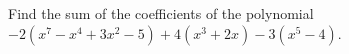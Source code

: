 Find the sum of the coefficients of the polynomial $-2\left(x^7-x^4+3x^2-5\right)+4\left(x^3+2x\right)-3\left(x^5-4\right)$.
